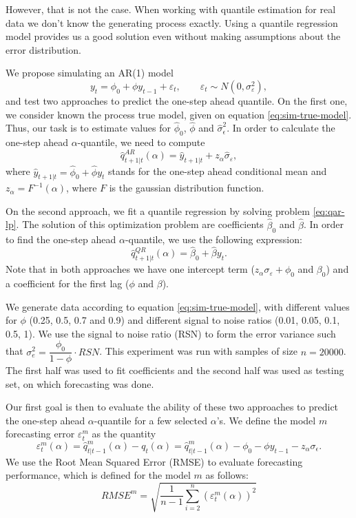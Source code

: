 However, that is not the case. When working with quantile estimation for real data we don't know the generating process exactly. Using a quantile regression model provides us a good solution even without making assumptions about the error distribution. 

We propose simulating an AR(1) model
\begin{equation}
	y_t = \phi_0 +  \phi y_{t-1} + \varepsilon_t,\qquad \varepsilon_t \sim N(0, \sigma_\varepsilon^2),	
\label{eq:sim-true-model}
\end{equation}
and test two approaches to predict the one-step ahead quantile. On the first one, we consider known the process true model, given on equation \ref{eq:sim-true-model}. Thus, our task is to estimate values for $\hat{\phi}_0$, $\hat{\phi}$ and $\hat{\sigma}_\epsilon^2$. In order to calculate the one-step ahead $\alpha$-quantile, we need to compute
\begin{equation}
	\hat{q}^{AR}_{t+1|t}(\alpha) = \hat{y}_{t+1|t} + z_\alpha \hat{\sigma}_\varepsilon,
\end{equation}
where $\hat{y}_{t+1|t} = \hat{\phi}_0 + \hat{\phi} y_{t}$ stands for the one-step ahead conditional mean and $z_\alpha = F^{-1}(\alpha)$, where $F$ is the gaussian distribution function.

On the second approach, we fit a quantile regression by solving problem \ref{eq:qar-lp}. The solution of this optimization problem are coefficients $\hat{\beta}_0$ and $\hat{\beta}$. In order to find the one-step ahead $\alpha$-quantile, we use the following expression:
\begin{equation}
		\hat{q}^{QR}_{t+1|t}(\alpha) = \hat{\beta}_0 + \hat{\beta} y_{t}.
\end{equation}
Note that in both approaches we have one intercept term ($z_\alpha \sigma_\varepsilon + {\phi}_0$ and $\beta_0$) and a coefficient for the first lag ($\phi$ and $\beta$). 

We generate data according to equation \ref{eq:sim-true-model}, with different values for $\phi$ (0.25, 0.5, 0.7 and 0.9) and different signal to noise ratios (0.01, 0.05, 0.1, 0.5, 1). We use the signal to noise ratio (RSN) to form the error variance such that $\sigma_e^2 = \dfrac{\phi_0}{1-\phi} \cdot RSN$. This experiment was run with samples of size $n=20000$. The first half was used to fit coefficients and the second half was used as testing set, on which forecasting was done.

Our first goal is then to evaluate the ability of these two approaches to predict the one-step ahead $\alpha$-quantile for a few selected $\alpha$'s. We define the model $m$ forecasting error $\varepsilon_t^m$ as the quantity 
\begin{equation}
\varepsilon_t^m(\alpha) = \hat{q}^m_{t|t-1}(\alpha) - q_t(\alpha) = \hat{q}^m_{t|t-1}(\alpha) - \phi_0 - \phi y_{t-1} - z_\alpha \sigma_\epsilon.
\end{equation}
We use the Root Mean Squared Error (RMSE) to evaluate forecasting performance, which is defined for the model $m$ as follows:
\begin{equation}
RMSE^m = \sqrt{ \frac{1}{n-1} \sum_{i=2}^{n} \left( \varepsilon_t^m(\alpha) \right)^2}
\end{equation}

